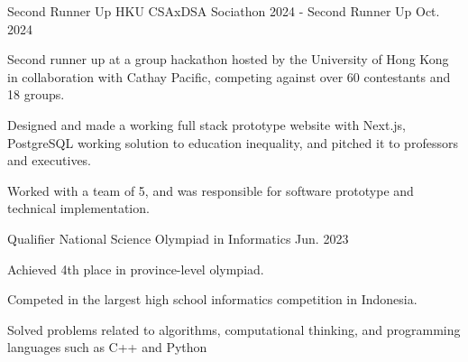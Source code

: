 
\begin{cventries}

  \cventry
    {Second Runner Up} %
    {HKU CSAxDSA Sociathon 2024 - Second Runner Up} %
    {} 
    {Oct. 2024} %
    {
      \begin{cvitems} %
        \item {Second runner up at a group hackathon hosted by the University of Hong Kong in collaboration with Cathay
Pacific, competing against over 60 contestants and 18 groups.}
        \item {Designed and made a working full stack prototype website with Next.js, PostgreSQL working solution to
education inequality, and pitched it to professors and executives.}
        \item {Worked with a team of 5, and was responsible for software prototype and technical implementation.}
      \end{cvitems}
    }
  
  \cventry
    {Qualifier} %
    {National Science Olympiad in Informatics} %
    {} 
    {Jun. 2023} %
    {
      \begin{cvitems} %
        \item {Achieved 4th place in province-level olympiad.}
        \item {Competed in the largest high school informatics competition in Indonesia.}
        \item {Solved problems related to algorithms, computational thinking, and programming languages such as C++ and
Python}
      \end{cvitems}
    } 
  \end{cventries}
    
  

  


